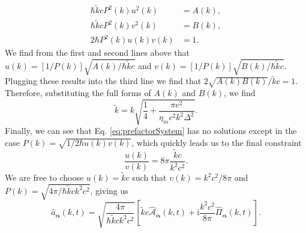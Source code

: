 \documentclass{article}
\begin{document}
\begin{equation}\label{eq:prefactorSystem}
\begin{split}
\hbar\tilde{k}cP^2(k)u^2(k) &= A(k),\\
\hbar\tilde{k}cP^2(k)v^2(k) &= B(k),\\
2\hbar P^2(k)u(k)v(k) &= 1.
\end{split}
\end{equation}
We find from the first and second lines above that $u(k) = [1/P(k)]\sqrt{A(k)/\hbar\tilde{k}c}$ and $v(k) = [1/P(k)]\sqrt{B(k)/\hbar\tilde{k}c}$. Plugging these results into the third line we find that $2\sqrt{A(k)B(k)}/\tilde{k}c = 1$. Therefore, substituting the full forms of $A(k)$ and $B(k)$, we find
\begin{equation}
\tilde{k} = k\sqrt{\frac{1}{4} + \frac{\pi e^2}{\eta_mc^2k^2\Delta^2}}.
\end{equation}
Finally, we can see that Eq. \eqref{eq:prefactorSystem} has no solutions except in the case $P(k) = \sqrt{1/2\hbar u(k)v(k)}$, which quickly leads us to the final constraint
\begin{equation}
\frac{u(k)}{v(k)} = 8\pi\frac{\tilde{k}c}{k^2c^2}.
\end{equation}
We are free to choose $u(k) = \tilde{k}c$ such that $v(k) = k^2c^2/8\pi$ and $P(k) = \sqrt{4\pi/\hbar\tilde{k}ck^2c^2}$, giving us
\begin{equation}
\hat{a}_{\bm{\alpha}}(k,t) = \sqrt{\frac{4\pi}{\hbar\tilde{k}ck^2c^2}}\left[\tilde{k}c\hat{\mathcal{A}}_{\bm{\alpha}}(k,t) + \mathrm{i}\frac{k^2c^2}{8\pi}\hat{\mathit{\Pi}}_{\bm{\alpha}}(k,t)\right].
\end{equation}
\end{document}
